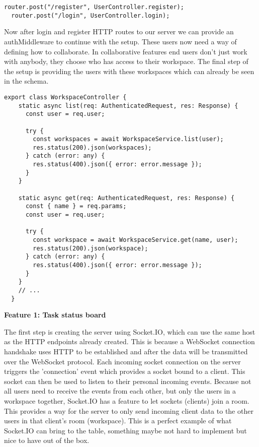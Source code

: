 \begin{lstlisting}[caption=Authentication routes]
  router.post("/register", UserController.register);
  router.post("/login", UserController.login);
\end{lstlisting}

Now after login and register HTTP routes to our server we can provide an authMiddleware to continue with the setup. These users now need a way of defining how to collaborate. In collaborative features end users don't just work with anybody, they choose who has access to their workspace. The final step of the setup is providing the users with these workspaces which can already be seen in the schema.

\begin{lstlisting}[caption=WorkspaceController]
  export class WorkspaceController {
    static async list(req: AuthenticatedRequest, res: Response) {
      const user = req.user;
   
      try {
        const workspaces = await WorkspaceService.list(user);
        res.status(200).json(workspaces);
      } catch (error: any) {
        res.status(400).json({ error: error.message });
      }
    }
   
    static async get(req: AuthenticatedRequest, res: Response) {
      const { name } = req.params;
      const user = req.user;
   
      try {
        const workspace = await WorkspaceService.get(name, user);
        res.status(200).json(workspace);
      } catch (error: any) {
        res.status(400).json({ error: error.message });
      }
    }
    // ...
  }   
\end{lstlisting}

\textbf{Feature 1: Task status board}

The first step is creating the server using Socket.IO, which can use the same host as the HTTP endpoints already created. This is because a WebSocket connection handshake uses HTTP to be established and after the data will be transmitted over the WebSocket protocol. Each incoming socket connection on the server triggers the 'connection' event which provides a socket bound to a client. This socket can then be used to listen to their personal incoming events. Because not all users need to receive the events from each other, but only the users in a workspace together, Socket.IO has a feature to let sockets (clients) join a room. This provides a way for the server to only send incoming client data to the other users in that client's room (workspace). This is a perfect example of what Socket.IO can bring to the table, something maybe not hard to implement but nice to have out of the box.

